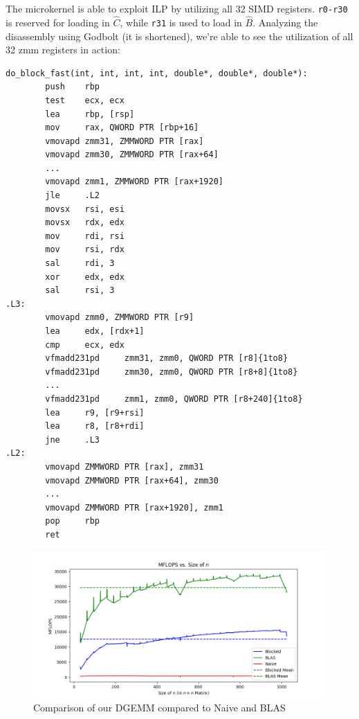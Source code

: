 \documentclass{article}
\begin{document}
The microkernel is able to exploit ILP by utilizing all 32 SIMD registers. \verb|r0-r30| is reserved for loading in $\hat{C}$, while \verb|r31| is used to load in $\hat{B}$. Analyzing the disassembly using Godbolt (it is shortened), we're able to see the utilization of all 32 zmm registers in action:
\label{do-block-fast-asm}
\begin{verbatim}
do_block_fast(int, int, int, int, double*, double*, double*):
        push    rbp
        test    ecx, ecx
        lea     rbp, [rsp]
        mov     rax, QWORD PTR [rbp+16]
        vmovapd zmm31, ZMMWORD PTR [rax]
        vmovapd zmm30, ZMMWORD PTR [rax+64]
        ...
        vmovapd zmm1, ZMMWORD PTR [rax+1920]
        jle     .L2
        movsx   rsi, esi
        movsx   rdx, edx
        mov     rdi, rsi
        mov     rsi, rdx
        sal     rdi, 3
        xor     edx, edx
        sal     rsi, 3
.L3:
        vmovapd zmm0, ZMMWORD PTR [r9]
        lea     edx, [rdx+1]
        cmp     ecx, edx
        vfmadd231pd     zmm31, zmm0, QWORD PTR [r8]{1to8}
        vfmadd231pd     zmm30, zmm0, QWORD PTR [r8+8]{1to8}
        ...
        vfmadd231pd     zmm1, zmm0, QWORD PTR [r8+240]{1to8}
        lea     r9, [r9+rsi]
        lea     r8, [r8+rdi]
        jne     .L3
.L2:
        vmovapd ZMMWORD PTR [rax], zmm31
        vmovapd ZMMWORD PTR [rax+64], zmm30
        ...
        vmovapd ZMMWORD PTR [rax+1920], zmm1
        pop     rbp
        ret
\end{verbatim}

\begin{figure}[H]
	\centerline{\includegraphics[width=6in]{figures/MFLOPS_compare.png}}
	\caption{Comparison of our DGEMM compared to Naive and BLAS}
	\label{fig:compare-dgemm}
\end{figure}
\end{document}
